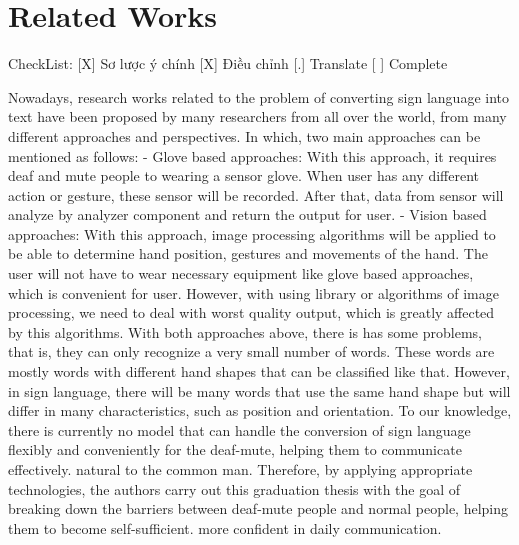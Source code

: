 \chapter{Related Works}
  CheckList: 
    [X] Sơ lược ý chính
    [X] Điều chỉnh
    [.] Translate
    [ ] Complete

    Nowadays, research works related to the problem of converting sign language into text 
    have been proposed by many researchers from all over the world, from many different 
    approaches and perspectives. In which, two main approaches can be mentioned as follows:
      - Glove based approaches:
        With this approach, it requires deaf and mute people to wearing a sensor glove. When user
        has any different action or gesture, these sensor will be recorded. After that, data from
        sensor will analyze by analyzer component and return the output for user.
      - Vision based approaches:
        With this approach, image processing algorithms will be applied to be able to determine
        hand position, gestures and movements of the hand. The user will not have to wear necessary
        equipment like glove based approaches, which is convenient for user. However, with using
        library or algorithms of image processing, we need to deal with worst quality output, which is
        greatly affected by this algorithms.
    With both approaches above, there is has some problems, that is, they can only recognize 
    a very small number of words. These words are mostly words with different hand shapes 
    that can be classified like that. However, in sign language, there will be many words 
    that use the same hand shape but will differ in many characteristics, such as position 
    and orientation. To our knowledge, there is currently no model that can handle the 
    conversion of sign language flexibly and conveniently for the deaf-mute, helping them 
    to communicate effectively. natural to the common man. Therefore, by applying appropriate 
    technologies, the authors carry out this graduation thesis with the goal of breaking down 
    the barriers between deaf-mute people and normal people, helping them to become self-sufficient. 
    more confident in daily communication.




